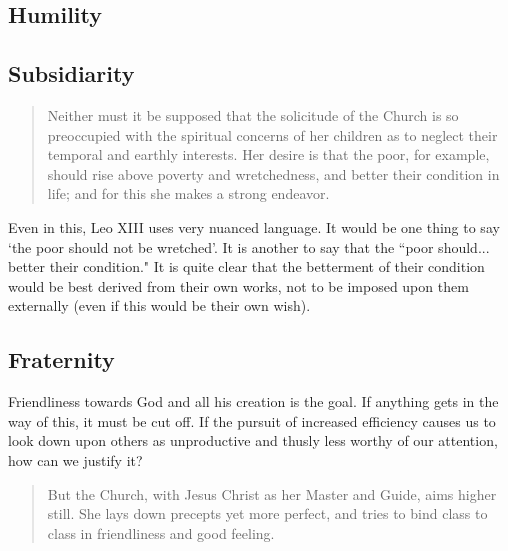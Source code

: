 \documentclass[letterpaper]{article}
\begin{document}
\hfill

\subsection{Humility}
\hfill

\hfill

\hfill

\hfill

\hfill

\hfill

\hfill

\subsection{Subsidiarity}

\begin{quote}
  Neither must it be supposed that the solicitude of the Church is so preoccupied with the spiritual concerns of her children as to neglect their temporal and earthly interests. Her desire is that the poor, for example, should rise above poverty and wretchedness, and better their condition in life; and for this she makes a strong endeavor.
\end{quote}

Even in this, Leo XIII uses very nuanced language. It would be one thing to say `the poor should not be wretched'. It is another to say that the ``poor should... better their condition."  It is quite clear that the betterment of their condition would be best derived from their own works, not to be imposed upon them externally (even if this would be their own wish).

\subsection{Fraternity}

Friendliness towards God and all his creation is the goal. If anything gets in the way of this, it must be cut off. If the pursuit of increased efficiency causes us to look down upon others as unproductive and thusly less worthy of our attention, how can we justify it?

\begin{quote}
  But the Church, with Jesus Christ as her Master and Guide, aims higher still. She lays down precepts yet more perfect, and tries to bind class to class in friendliness and good feeling.
\end{quote}
\end{document}
